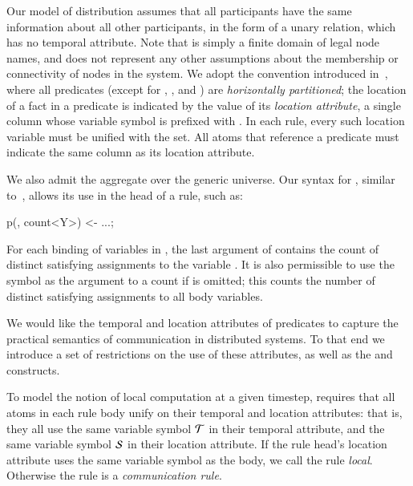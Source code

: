 Our model of distribution assumes that all participants have the same information about all other participants, in the form of a unary  relation, which has no temporal attribute. Note that  is simply a finite domain of legal node names, and does not represent any other assumptions about the membership or connectivity of nodes in the system. We adopt the convention introduced in~\cite{Loo:2005}, where all predicates (except for , , and ) are {\em horizontally partitioned};  the location of a fact in a predicate is indicated by the value of its {\em location attribute}, a single column whose variable symbol is prefixed with \dedalus{\#}.  In each \lang rule, every such location variable must be unified with the  set.  All atoms that reference a predicate must indicate the same column as its location attribute.

We also admit the  aggregate over the generic universe.  Our syntax for , similar to~\cite{datalog-agg}, allows its use in the head of a rule, such as:

\begin{Dedalus}
p(, count<Y>) <- ...;
\end{Dedalus}

For each binding of variables in , the last argument of  contains the count of distinct satisfying assignments to the variable .  It is also permissible to use the symbol \dedalus{*} as the argument to a count if  is omitted; this counts the number of distinct satisfying assignments to all body variables.


\vspace{1em}
We would like the temporal and location attributes of \lang predicates to capture the practical semantics of communication in distributed systems.  To that end we introduce a set of restrictions on the use of these attributes, as well as the  and  constructs.

To model the notion of local computation at a given timestep, \lang requires that all atoms in each rule body unify on their temporal and location attributes: that is, they all use the same variable symbol $\Tau$ in their temporal attribute, and the same variable symbol $\SDedalus$ in their location attribute.  If the rule head's location attribute uses the same variable symbol as the body, we call the rule {\em local}.  Otherwise the rule is a {\em communication rule}.

